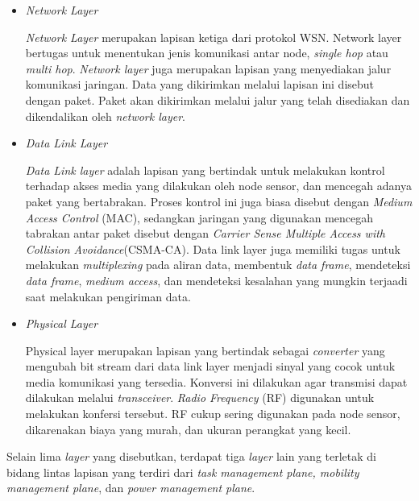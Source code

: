 \begin{itemize}
    \item \textit{Network Layer}
    
    \textit{Network Layer} merupakan lapisan ketiga dari protokol WSN. Network layer bertugas untuk menentukan jenis komunikasi antar node, \textit{single hop} atau \textit{multi hop}. \textit{Network layer} juga merupakan lapisan yang menyediakan jalur komunikasi jaringan. Data yang dikirimkan melalui lapisan ini disebut dengan paket. Paket akan dikirimkan melalui jalur yang telah disediakan dan dikendalikan oleh \textit{network layer}.
    
    \item \textit{Data Link Layer}
    
    \textit{Data Link layer} adalah lapisan yang bertindak untuk melakukan kontrol terhadap akses media yang dilakukan oleh node sensor, dan mencegah adanya paket yang bertabrakan. Proses kontrol ini juga biasa disebut dengan \textit{Medium Access Control }(MAC), sedangkan jaringan yang digunakan mencegah tabrakan antar paket disebut dengan \textit{Carrier Sense Multiple Access with Collision Avoidance}(CSMA-CA). Data link layer juga memiliki tugas untuk melakukan \textit{multiplexing} pada aliran data, membentuk \textit{data frame}, mendeteksi \textit{data frame}, \textit{medium access}, dan mendeteksi kesalahan yang mungkin terjaadi saat melakukan pengiriman data.
    
    \item \textit{Physical Layer}
    
    Physical layer merupakan lapisan yang bertindak sebagai \textit{converter} yang mengubah bit stream dari data link layer menjadi sinyal yang cocok untuk media komunikasi yang tersedia. Konversi ini dilakukan agar transmisi dapat dilakukan melalui \textit{transceiver}. \textit{Radio Frequency} (RF) digunakan untuk melakukan konfersi tersebut.  RF cukup sering digunakan pada node sensor, dikarenakan biaya yang murah, dan ukuran perangkat yang kecil.
    
    
\end{itemize}

Selain lima \textit{layer} yang disebutkan, terdapat tiga \textit{layer} lain yang terletak di bidang lintas lapisan yang terdiri dari \textit{task management plane, mobility management plane}, dan \textit{power management plane}.

